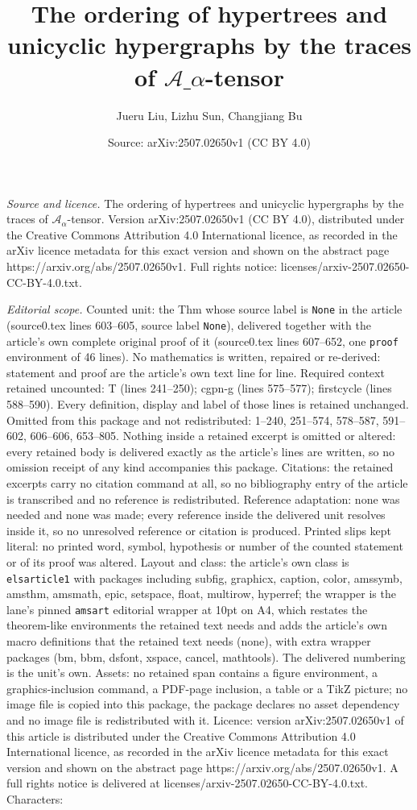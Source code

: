 \documentclass[10pt,a4paper]{amsart}
\title[The ordering of hypertrees and unicyclic hypergraphs by the ]{The ordering of hypertrees and unicyclic hypergraphs by the traces of $\mathcal{A}\_{\alpha}$-tensor}
\author{Jueru Liu, Lizhu Sun, Changjiang Bu}
\date{Source: arXiv:2507.02650v1 (CC BY 4.0)}
\begin{document}
\maketitle

\noindent\emph{Source and licence.} The ordering of hypertrees and unicyclic hypergraphs by the traces of $\mathcal{A}_{\alpha}$-tensor. Version arXiv:2507.02650v1 (CC BY 4.0), distributed under the Creative Commons Attribution 4.0 International licence, as recorded in the arXiv licence metadata for this exact version and shown on the abstract page https://arxiv.org/abs/2507.02650v1. Full rights notice: licenses/arxiv-2507.02650-CC-BY-4.0.txt.\par\smallskip

\noindent\textit{Editorial scope.} Counted unit: the Thm whose source label is \texttt{None} in the article (source0.tex lines 603--605, source label \texttt{None}), delivered together with the article's own complete original proof of it (source0.tex lines 607--652, one \texttt{proof} environment of 46 lines). No mathematics is written, repaired or re-derived: statement and proof are the article's own text line for line. Required context retained uncounted: T (lines 241--250); cgpn-g (lines 575--577); firstcycle (lines 588--590). Every definition, display and label of those lines is retained unchanged. Omitted from this package and not redistributed: 1--240, 251--574, 578--587, 591--602, 606--606, 653--805. Nothing inside a retained excerpt is omitted or altered: every retained body is delivered exactly as the article's lines are written, so no omission receipt of any kind accompanies this package. Citations: the retained excerpts carry no citation command at all, so no bibliography entry of the article is transcribed and no reference is redistributed. Reference adaptation: none was needed and none was made; every reference inside the delivered unit resolves inside it, so no unresolved reference or citation is produced. Printed slips kept literal: no printed word, symbol, hypothesis or number of the counted statement or of its proof was altered. Layout and class: the article's own class is \texttt{elsarticle1} with packages including subfig, graphicx, caption, color, amssymb, amsthm, amsmath, epic, setspace, float, multirow, hyperref; the wrapper is the lane's pinned \texttt{amsart} editorial wrapper at 10pt on A4, which restates the theorem-like environments the retained text needs and adds the article's own macro definitions that the retained text needs (none), with extra wrapper packages (bm, bbm, dsfont, xspace, cancel, mathtools). The delivered numbering is the unit's own. Assets: no retained span contains a figure environment, a graphics-inclusion command, a PDF-page inclusion, a table or a TikZ picture; no image file is copied into this package, the package declares no asset dependency and no image file is redistributed with it. Licence: version arXiv:2507.02650v1 of this article is distributed under the Creative Commons Attribution 4.0 International licence, as recorded in the arXiv licence metadata for this exact version and shown on the abstract page https://arxiv.org/abs/2507.02650v1. A full rights notice is delivered at licenses/arxiv-2507.02650-CC-BY-4.0.txt. Characters: 
\end{document}
